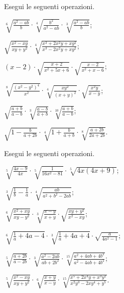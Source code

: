 \begin{esercizio}[\Ast]
 \label{ese:2.45}
Esegui le seguenti operazioni.
 \begin{multicols}{2}
 \begin{enumeratea}
 \item $\sqrt[6]{\frac{a^2-ab}{b}}\cdot\sqrt[4]{\frac{b^2}{a^2-ab}}\cdot\sqrt[3]{\frac{a^2-ab}{b}}$;
 \item $\sqrt{\frac{x^2-xy}{xy+y^2}}\cdot\sqrt[4]{\frac{x^3+2x^2y+xy^2}{x^3-2x^2y+xy^2}}$;
 \item $(x-2)\cdot\sqrt{\frac{x+2}{x^2+5x+6}}\cdot\sqrt{\frac{x-2}{x^2+x-6}}$;
 \item $\sqrt[8]{\frac{(x^2-y^2)^4}{x^2}}\cdot\sqrt[4]{\frac{xy^2}{(x+y)^2}}\cdot\sqrt{\frac{x^2y}{x-y}}$;
 \item $\sqrt{\frac{a+b}{a-b}}\cdot\sqrt[3]{\frac{a-b}{a+b}}\cdot\sqrt[10]{\frac{a+b}{a-b}}$;
 \item $\sqrt{1-\frac{b}{a+2b}}\cdot\sqrt[4]{1+\frac{b}{a+b}}\cdot\sqrt[8]{\frac{a+2b}{2a+2b}}$.
 \end{enumeratea}
 \end{multicols}
\end{esercizio}

\begin{esercizio}[\Ast]
 \label{ese:2.46}
Esegui le seguenti operazioni.
 \begin{enumeratea}
 \item $\sqrt[5]{\frac{4x-9}{4x}}\cdot\sqrt[5]{\frac{1}{16x^2-81}}\cdot\sqrt[5]{4x(4x+9)}$;
 \item $\sqrt[3]{\frac{1}{b}-\frac{1}{a}}\cdot\sqrt[4]{\frac{ab}{a^2+b^2-2ab}}$;
 \item $\sqrt[6]{\frac{x^2+xy}{xy-y^2}}\cdot\sqrt[3]{\frac{x-y}{x+y}}\cdot\sqrt{\frac{xy+y^2}{x^2-xy}}$;
 \item $\sqrt[6]{\frac{1}{a}+4a-4}\cdot\sqrt[3]{\frac{1}{a}+4a+4}\cdot\sqrt{\frac{a}{4a^2-1}}$;
 \item $\sqrt[5]{\frac{a+2b}{a-2b}}\cdot\sqrt[3]{\frac{a^2-2ab}{ab+2b^2}}\cdot\sqrt[15]{\frac{a^2+4ab+4b^2}{a^2-4ab+4b^2}}$;
 \item $\sqrt[5]{\frac{x^2-xy}{xy+y^2}}\cdot\sqrt[6]{\frac{x+y}{x-y}}\cdot\sqrt[15]{\frac{x^5+2x^4y+x^3y^2}{x^2y^3-2xy^4+y^5}}$.
 \end{enumeratea}
\end{esercizio}

